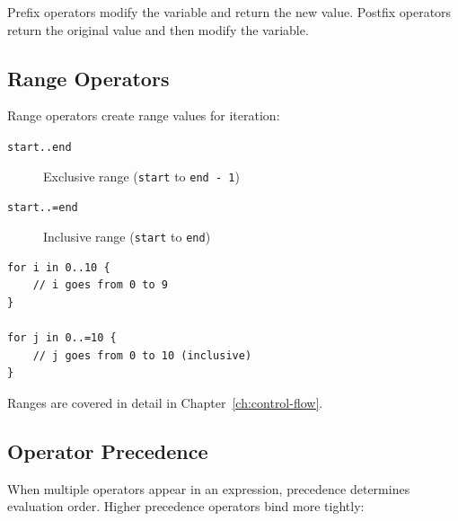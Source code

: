 Prefix operators modify the variable and return the new value. Postfix operators return the original value and then modify the variable.

\subsection{Range Operators}

Range operators create range values for iteration:

\begin{description}
    \item[\texttt{start..end}] Exclusive range (\texttt{start} to \texttt{end - 1})
    \item[\texttt{start..=end}] Inclusive range (\texttt{start} to \texttt{end})
\end{description}

\begin{lstlisting}
for i in 0..10 {
    // i goes from 0 to 9
}

for j in 0..=10 {
    // j goes from 0 to 10 (inclusive)
}
\end{lstlisting}

Ranges are covered in detail in Chapter~\ref{ch:control-flow}.

\subsection{Operator Precedence}

When multiple operators appear in an expression, precedence determines evaluation order. Higher precedence operators bind more tightly:

